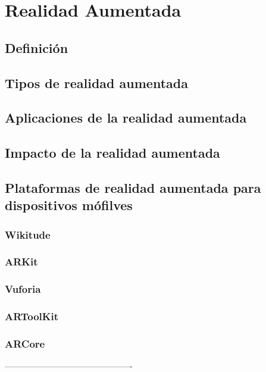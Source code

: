 \section{Realidad Aumentada}

\subsection{Definición}
\subsection{Tipos de realidad aumentada}
\subsection{Aplicaciones de la realidad aumentada}
\subsection{Impacto de la realidad aumentada}
\subsection{Plataformas de realidad aumentada para dispositivos mófilves}

\subsubsection{Wikitude}
\subsubsection{ARKit}
\subsubsection{Vuforia}
\subsubsection{ARToolKit}
\subsubsection{ARCore}


----------------------------------------------


